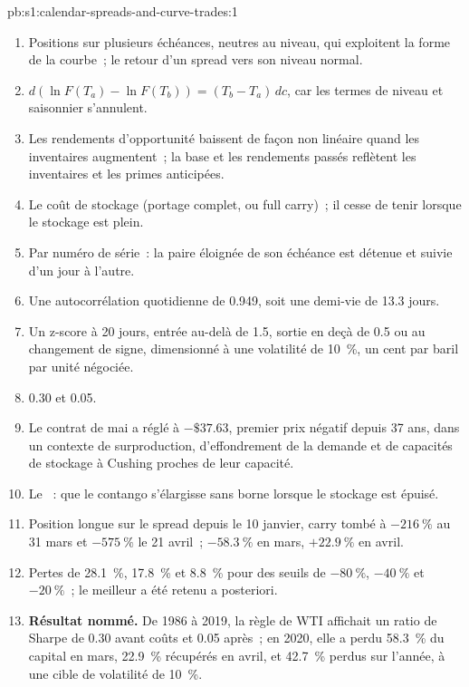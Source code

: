 \begin{solution}{pb:s1:calendar-spreads-and-curve-trades:1}
\begin{enumerate}
\item Positions sur plusieurs échéances, neutres au niveau, qui exploitent la forme de la courbe~; le retour d'un spread vers son niveau normal.
\item $d(\ln F(T_a) - \ln F(T_b)) = (T_b - T_a)\,dc$, car les termes de niveau et saisonnier s'annulent.
\item Les rendements d'opportunité baissent de façon non linéaire quand les inventaires augmentent~; la base et les rendements passés reflètent les inventaires et les primes anticipées.
\item Le coût de stockage (portage complet, ou full carry)~; il cesse de tenir lorsque le stockage est plein.
\item Par numéro de série~: la paire éloignée de son échéance est détenue et suivie d'un jour à l'autre.
\item Une autocorrélation quotidienne de 0.949, soit une demi-vie de 13.3 jours.
\item Un z-score à 20 jours, entrée au-delà de 1.5, sortie en deçà de 0.5 ou au changement de signe, dimensionné à une volatilité de 10~\%, un cent par baril par unité négociée.
\item 0.30 et 0.05.
\item Le contrat de mai a réglé à $-\$37.63$, premier prix négatif depuis 37 ans, dans un contexte de surproduction, d'effondrement de la demande et de capacités de stockage à Cushing proches
de leur capacité.
\item Le ~: que le contango s'élargisse sans borne lorsque le stockage est épuisé.
\item Position longue sur le spread depuis le 10 janvier, carry tombé à $-216~\%$ au 31 mars et $-575~\%$ le 21 avril~; $-58.3~\%$ en mars, $+22.9~\%$ en avril.
\item Pertes de 28.1~\%, 17.8~\% et 8.8~\% pour des seuils de $-80~\%$, $-40~\%$ et $-20~\%$~; le meilleur a été retenu a posteriori.
\item \textbf{Résultat nommé.} De 1986 à 2019, la règle de  WTI affichait un ratio de Sharpe de 0.30 avant coûts et 0.05 après~; en 2020, elle a perdu
58.3~\% du capital en mars, 22.9~\% récupérés en avril, et 42.7~\% perdus sur l'année, à une cible de volatilité de 10~\%.

\end{enumerate}
\end{solution}
